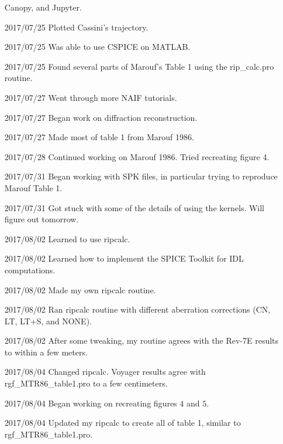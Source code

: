 \documentclass[crop=false,class=article,oneside]{standalone}
\begin{document}
\begin{enumerate}[leftmargin=55pt]
                              Canopy, and Jupyter.
            \item[2017/07/25] Plotted Cassini's trajectory.
            \item[2017/07/25] Was able to use CSPICE on MATLAB.
            \item[2017/07/25] Found several parts of Marouf's Table 1
                              using the rip\_calc.pro routine.
            \item[2017/07/27] Went through more NAIF tutorials.
            \item[2017/07/27] Began work on diffraction reconstruction.
            \item[2017/07/27] Made most of table 1 from Marouf 1986.
            \item[2017/07/28] Continued working on Marouf 1986.
                              Tried recreating figure 4.
            \item[2017/07/31] Began working with SPK files,
                              in particular trying
                              to reproduce Marouf Table 1.
            \item[2017/07/31] Got stuck with some of the details
                              of using the
                              kernels. Will figure out tomorrow.
            \item[2017/08/02] Learned to use ripcalc.
            \item[2017/08/02] Learned how to implement the SPICE Toolkit
                              for IDL computations.
            \item[2017/08/02] Made my own ripcalc routine.
            \item[2017/08/02] Ran ripcalc routine with different
                              aberration corrections (CN, LT, LT+S, and NONE).
            \item[2017/08/02] After some tweaking, my routine
                              agrees with the
                              Rev-7E results to within a few meters.
            \item[2017/08/04] Changed ripcalc. Voyager results
                              agree with rgf\_MTR86\_table1.pro to a
                              few centimeters.
            \item[2017/08/04] Began working on recreating
                              figures $4$ and $5$.
            \item[2017/08/04] Updated my ripcalc to create all of table 1,
                              similar to rgf\_MTR86\_table1.pro.

\end{enumerate}
\end{document}
